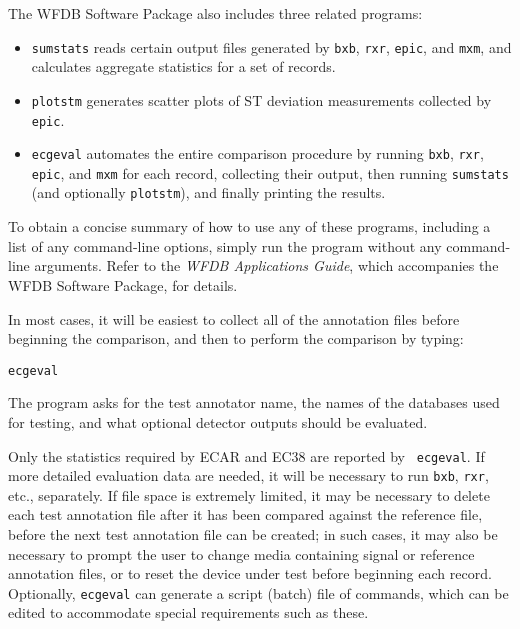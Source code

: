 The WFDB Software Package also includes three related programs:
\begin{itemize}
   \item {\tt sumstats} reads certain output files generated by {\tt bxb},
{\tt rxr}, {\tt epic}, and {\tt mxm}, and calculates aggregate statistics for
a set of records.
   \item {\tt plotstm} generates scatter plots of ST deviation measurements
collected by {\tt epic}.
   \item {\tt ecgeval} automates the entire comparison procedure by running
{\tt bxb}, {\tt rxr}, {\tt epic}, and {\tt mxm} for each record, collecting
their output, then running {\tt sumstats} (and optionally {\tt plotstm}), and
finally printing the results.
\end{itemize}

To obtain a concise summary of how to use any of these programs, including
a list of any command-line options, simply run the program without any
command-line arguments.  Refer to the {\it WFDB Applications Guide},
which accompanies the WFDB Software Package, for details.

In most cases, it will be easiest to collect all of the annotation files
before beginning the comparison, and then to perform the comparison by typing:
\begin{verbatim}
ecgeval
\end{verbatim}
The program asks for the test annotator name, the names of the databases
used for testing, and what optional detector outputs should be evaluated.

Only the statistics required by ECAR and EC38 are reported by {\tt
ecgeval}.  If more detailed evaluation data are needed, it will be
necessary to run {\tt bxb}, {\tt rxr}, etc., separately.  If file
space is extremely limited, it may be necessary to delete each test
annotation file after it has been compared against the reference file,
before the next test annotation file can be created; in such cases, it
may also be necessary to prompt the user to change media containing
signal or reference annotation files, or to reset the device under
test before beginning each record.  Optionally, {\tt ecgeval} can
generate a script (batch) file of commands, which can be edited to
accommodate special requirements such as these.

